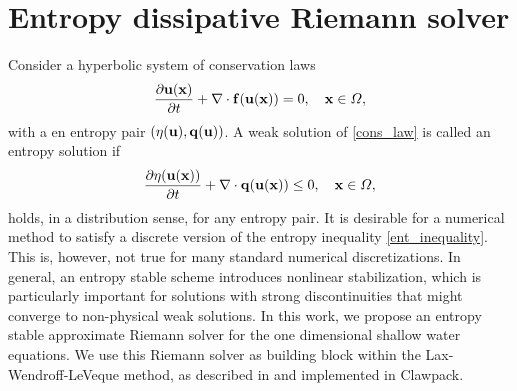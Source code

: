 \documentclass[preprint, 11pt]{article}
\newcommand{\bff}{{\bf f}}
\newcommand{\bfu}{{\bf u}}
\newcommand{\bfq}{{\bf q}}
\newcommand{\bfx}{{\bf x}}
\begin{document}
\section{Entropy dissipative Riemann solver}\label{sec:ent_diss_rs}
Consider a hyperbolic system of conservation laws 
\begin{align}\label{cons_law}
  \frac{\partial \bfu(\bfx)}{\partial t} + \nabla\cdot \bff(\bfu(\bfx))=0, \quad \bfx\in\Omega,
\end{align}
with a en entropy pair $\left(\eta(\bfu), \bfq(\bfu)\right)$. 
A weak solution of \eqref{cons_law} is called an entropy solution if 
\begin{align}\label{ent_inequality}
  \frac{\partial \eta(\bfu(\bfx))}{\partial t} + \nabla\cdot \bfq(\bfu(\bfx))\leq 0, \quad \bfx\in\Omega,
\end{align}
holds, in a distribution sense, for any entropy pair.
It is desirable for a numerical method to satisfy a discrete version of the entropy inequality 
\eqref{ent_inequality}. This is, however, not true for many standard numerical discretizations. 
In general, an entropy stable scheme introduces nonlinear stabilization, which is 
particularly important for solutions with strong discontinuities that might converge to non-physical 
weak solutions. 
In this work, we propose an entropy stable approximate Riemann solver for the one dimensional 
shallow water equations. We use this Riemann solver as building block within the Lax-Wendroff-LeVeque 
method, as described in \cite{leveque1997wave,leveque2002finite} and implemented in Clawpack.
\end{document}
